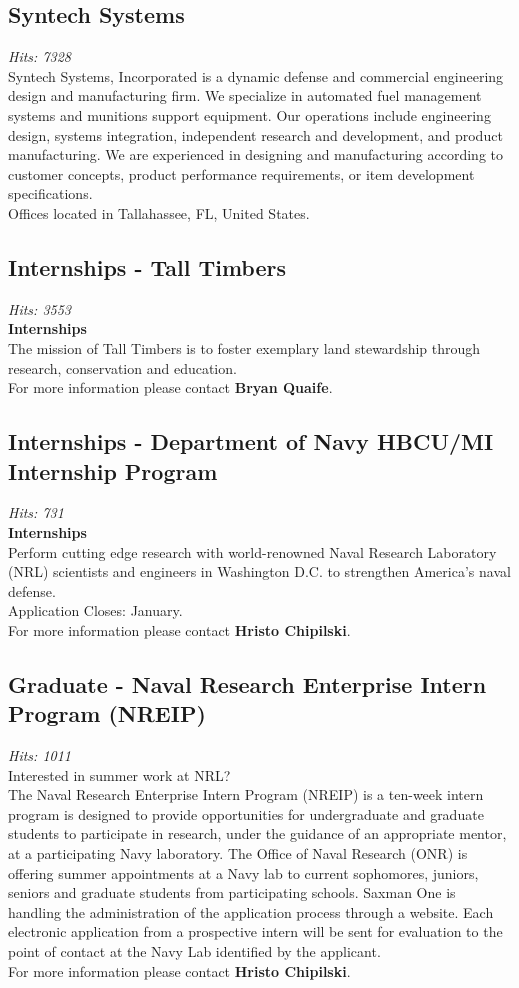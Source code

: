 \documentclass[12pt,a4paper]{article}
\begin{document}
\subsection{Syntech Systems}
\textit{Hits: 7328} \\
Syntech Systems, Incorporated is a dynamic defense and commercial engineering design and manufacturing firm. We specialize in automated fuel management systems and munitions support equipment. Our operations include engineering design, systems integration, independent research and development, and product manufacturing. We are experienced in designing and manufacturing according to customer concepts, product performance requirements, or item development specifications. \\
Offices located in Tallahassee, FL, United States.

\subsection{Internships - Tall Timbers}
\textit{Hits: 3553} \\
\textbf{Internships} \\
The mission of Tall Timbers is to foster exemplary land stewardship through research, conservation and education. \\
For more information please contact \textbf{Bryan Quaife}.

\subsection{Internships - Department of Navy HBCU/MI Internship Program}
\textit{Hits: 731} \\
\textbf{Internships} \\
Perform cutting edge research with world-renowned Naval Research Laboratory (NRL) scientists and engineers in Washington D.C. to strengthen America's naval defense. \\
Application Closes: January. \\
For more information please contact \textbf{Hristo Chipilski}.

\subsection{Graduate - Naval Research Enterprise Intern Program (NREIP)}
\textit{Hits: 1011} \\
Interested in summer work at NRL? \\
The Naval Research Enterprise Intern Program (NREIP) is a ten-week intern program is designed to provide opportunities for undergraduate and graduate students to participate in research, under the guidance of an appropriate mentor, at a participating Navy laboratory. The Office of Naval Research (ONR) is offering summer appointments at a Navy lab to current sophomores, juniors, seniors and graduate students from participating schools. Saxman One is handling the administration of the application process through a website. Each electronic application from a prospective intern will be sent for evaluation to the point of contact at the Navy Lab identified by the applicant. \\
For more information please contact \textbf{Hristo Chipilski}.
\end{document}
